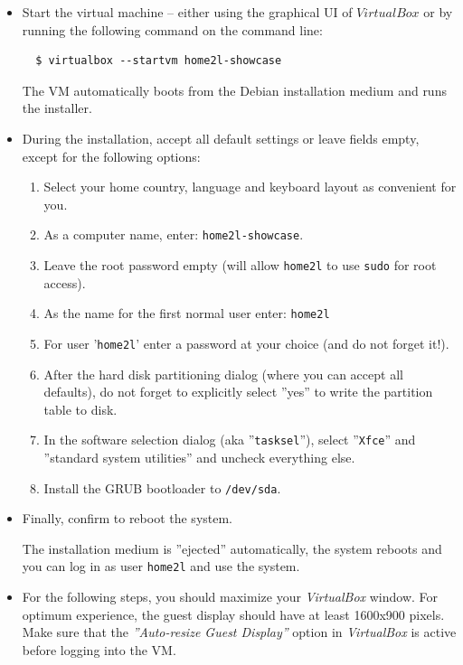 \documentclass[12pt,english,parskip=half]{scrreprt}
\begin{document}
\begin{itemize}[$\blacktriangleright$]

\item
  Start the virtual machine -- either using the graphical UI of $VirtualBox$ or by running the
  following command on the command line:

  \begin{lstlisting}
  $ virtualbox --startvm home2l-showcase
  \end{lstlisting}

  The VM automatically boots from the Debian installation medium and runs the installer.

\item
  During the installation, accept all default settings or leave fields
  empty, except for the following options:

  \begin{enumerate}
    \item Select your home country, language and keyboard layout as convenient for you.
    \item As a computer name, enter: \texttt{home2l-showcase}.
    \item Leave the root password empty (will allow \texttt{home2l} to use \texttt{sudo} for root access).
    \item As the name for the first normal user enter: \texttt{home2l}
    \item For user '\texttt{home2l}' enter a password at your choice (and do not forget it!).
    \item After the hard disk partitioning dialog (where you can accept all defaults), do not forget to explicitly select ''yes'' to write the partition table to disk.
    \item In the software selection dialog (aka ''\texttt{tasksel}''), select ''\texttt{Xfce}'' and ''standard system utilities'' and uncheck everything else.
    \item Install the GRUB bootloader to \texttt{/dev/sda}.
  \end{enumerate}

\item
  Finally, confirm to reboot the system.

  The installation medium is ''ejected'' automatically, the system reboots and you can log in as user
  \texttt{home2l} and use the system.

\item
  For the following steps, you should maximize your \emph{VirtualBox} window.
  For optimum experience, the guest display should have at least 1600x900 pixels.
  Make sure that the \emph{''Auto-resize Guest Display''} option in \emph{VirtualBox}
  is active before logging into the VM.

\end{itemize}
\end{document}
